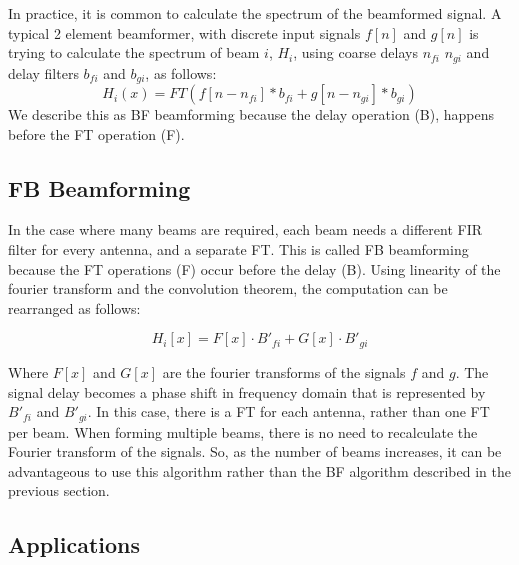 In practice, it is common to calculate the spectrum of the beamformed signal. 
A typical 2 element beamformer, with discrete input signals $f[n]$ and $g[n]$ is trying to calculate the spectrum of beam $i$, $H_i$, using coarse delays $n_{fi}$  $n_{gi}$ and delay filters $b_{fi}$ and $b_{gi}$, as follows: 
\[H_i(x) = FT(f[n-n_{fi}]\ast b_{fi} + g[n-n_{gi}]\ast b_{gi})\]
We describe this as BF beamforming because the delay operation (B), happens before the FT operation (F).


\subsection{FB Beamforming}
In the case where many beams are required, each beam needs a different FIR filter for every antenna, and a separate FT. 
This is called FB beamforming because the FT operations (F) occur before the delay (B). 
Using linearity of the fourier transform and the convolution theorem, the computation can be rearranged as follows:

\[H_i[x] = F[x] \cdot B'_{fi} + G[x] \cdot B'_{gi}\]

Where $F[x]$ and $G[x]$ are the fourier transforms of the signals $f$ and $g$.
The signal delay becomes a phase shift in frequency domain that is represented by $B'_{fi}$ and $B'_{gi}$. 
In this case, there is a FT for each antenna, rather than one FT per beam. 
When forming multiple beams, there is no need to recalculate the Fourier transform of the signals. 
So, as the number of beams increases, it can be advantageous to use this algorithm rather than the BF algorithm described in the previous section. 

\subsection{Applications}
\cite{2012Sci...338..355D}


